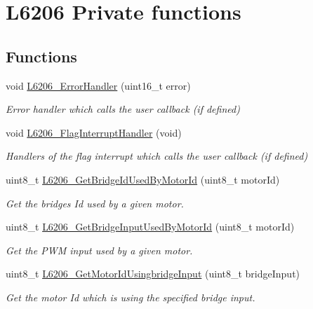 \hypertarget{group___l6206___private__functions}{}\section{L6206 Private functions}
\label{group___l6206___private__functions}
\subsection*{Functions}
\begin{DoxyCompactItemize}
\item 
void \mbox{\hyperlink{group___l6206___private__functions_ga0e92a09f08eaaf3145c79ecf069dce03}{L6206\+\_\+\+Error\+Handler}} (uint16\+\_\+t error)
\begin{DoxyCompactList}\small\item\em Error handler which calls the user callback (if defined) \end{DoxyCompactList}\item 
void \mbox{\hyperlink{group___l6206___private__functions_gabbcf9b4b7f5b609bab60c5fe3906c4b5}{L6206\+\_\+\+Flag\+Interrupt\+Handler}} (void)
\begin{DoxyCompactList}\small\item\em Handlers of the flag interrupt which calls the user callback (if defined) \end{DoxyCompactList}\item 
uint8\+\_\+t \mbox{\hyperlink{group___l6206___private__functions_gae2996e5793bc86d91bd050faf43da273}{L6206\+\_\+\+Get\+Bridge\+Id\+Used\+By\+Motor\+Id}} (uint8\+\_\+t motor\+Id)
\begin{DoxyCompactList}\small\item\em Get the bridges Id used by a given motor. \end{DoxyCompactList}\item 
uint8\+\_\+t \mbox{\hyperlink{group___l6206___private__functions_gad764d0c14a17388f39b97fe91175ed7b}{L6206\+\_\+\+Get\+Bridge\+Input\+Used\+By\+Motor\+Id}} (uint8\+\_\+t motor\+Id)
\begin{DoxyCompactList}\small\item\em Get the P\+WM input used by a given motor. \end{DoxyCompactList}\item 
uint8\+\_\+t \mbox{\hyperlink{group___l6206___private__functions_ga8e21b9719302c02b7044178cd4d93d97}{L6206\+\_\+\+Get\+Motor\+Id\+Usingbridge\+Input}} (uint8\+\_\+t bridge\+Input)
\begin{DoxyCompactList}\small\item\em Get the motor Id which is using the specified bridge input. \end{DoxyCompactList}\item 

\end{DoxyCompactItemize}
